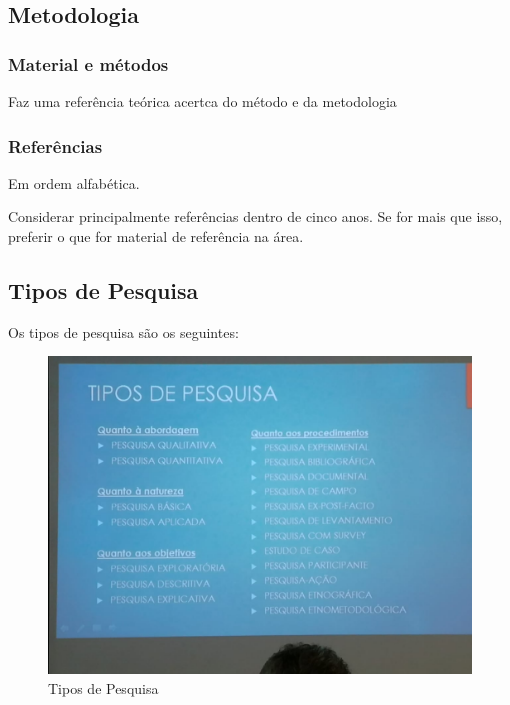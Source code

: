     \subsection{Metodologia}

        \subsubsection{Material e métodos}
            Faz uma referência teórica acertca do método e da metodologia

        \subsubsection{Referências}
            Em ordem alfabética.

            Considerar principalmente referências dentro de cinco anos. Se for mais que isso, preferir o que for material de referência na área.
    
    \subsection{Tipos de Pesquisa}
        Os tipos de pesquisa são os seguintes:

        \begin{figure}[h]
            \centering
            \includegraphics[width=1\textwidth]{figuras/tipos-pesquisa}
            \caption[Figura]{Tipos de Pesquisa}
            \label{tipos-pesquisa}
        \end{figure}


